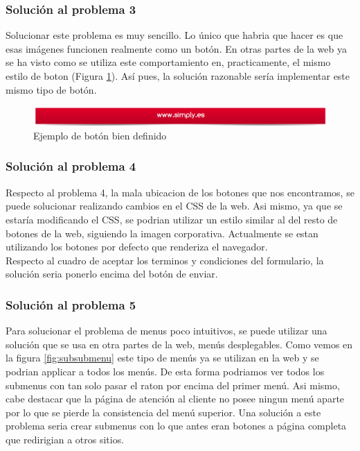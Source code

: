 \documentclass[a4paper,11pt]{article}
\begin{document}
\subsubsection{Solución al problema 3}
Solucionar este problema es muy sencillo. Lo único que habria que hacer es que esas imágenes funcionen realmente como un botón. En otras partes de la web ya se ha visto como se utiliza este comportamiento en, practicamente, el mismo estilo de boton (Figura \ref{fig:siesunboton}). Así pues, la solución razonable sería implementar este mismo tipo de botón.

\begin{figure}[h!]
 \centering
 \includegraphics[scale=0.4]{siesunboton.png}
 \caption{Ejemplo de botón bien definido}
 \label{fig:siesunboton}
\end{figure}

\subsubsection{Solución al problema 4}
Respecto al problema 4, la mala ubicacion de los botones que nos encontramos, se puede solucionar realizando cambios en el CSS de la web. Asi mismo, ya que se estaría modificando el CSS, se podrian utilizar un estilo similar al del resto de botones de la web, siguiendo la imagen corporativa. Actualmente se estan utilizando los botones por defecto que renderiza el navegador.\\
Respecto al cuadro de aceptar los terminos y condiciones del formulario, la solución seria ponerlo encima del botón de enviar.

\subsubsection{Solución al problema 5}
Para solucionar el problema de menus poco intuitivos, se puede utilizar una solución que se usa en otra partes de la web, menús desplegables.
Como vemos en la figura \ref{fig:subsubmenu} este tipo de menús ya se utilizan en la web y se podrian applicar a todos los menús. De esta forma podriamos ver todos los submenus con tan solo pasar el raton por encima del primer menú. Asi mismo, cabe destacar que la página de atención al cliente no posee ningun menú aparte por lo que se pierde la consistencia del menú superior. Una solución a este problema seria crear submenus con lo que antes eran botones a página completa que redirigian a otros sitios.
\end{document}
